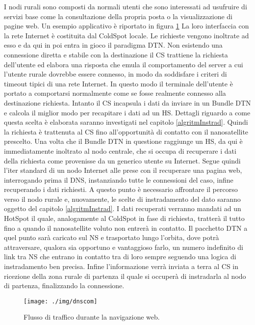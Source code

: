 \documentclass[12pt,a4paper,oneside]{book}
\begin{document}
		I nodi rurali sono composti da normali utenti che sono interessati ad usufruire di servizi base come la consultazione della propria posta o la visualizzazione di pagine web. Un esempio applicativo è riportato in figura \ref{fig:dnscom} La loro interfaccia con la rete Internet è costituita dal ColdSpot locale. Le richieste vengono inoltrate ad esso e da qui in poi entra in gioco il paradigma DTN. Non esistendo una connessione diretta e stabile con la destinazione il CS trattiene la richiesta dell'utente ed elabora una risposta che emula il comportamento del server a cui l'utente rurale dovrebbe essere connesso, in modo da soddisfare i criteri di timeout tipici di una rete Internet. In questo modo il terminale dell'utente è portato a comportarsi normalmente come se fosse realmente connesso alla destinazione richiesta. Intanto il CS incapsula i dati da inviare in un Bundle DTN e calcola il miglior modo per recapitare i dati ad un HS. Dettagli riguardo a come questa scelta è elaborata saranno investigati nel capitolo \ref{algritmInstrad}. Quindi la richiesta è trattenuta al CS fino all'opportunità di contatto con il nanosatellite prescelto. Una volta che il Bundle DTN in questione raggiunge un HS, da qui è immediatamente inoltrato al nodo centrale, che si occupa di recuperare i dati della richiesta come provenisse da un generico utente su Internet. Segue quindi l'iter standard di un nodo Internet alle prese con il recuperare una pagina web, interrogando prima il DNS, instanziando tutte le connessioni del caso, infine recuperando i dati richiesti. A questo punto è necessario affrontare il percorso verso il nodo rurale e, nuovamente, le scelte di instradamento del dato saranno oggetto del capitolo \ref{algritmInstrad}. I dati recuperati verranno mandati ad un HotSpot il quale, analogamente al ColdSpot in fase di richiesta, tratterà il tutto fino a quando il nanosatellite voluto non entrerà in contatto. Il pacchetto DTN a quel punto sarà caricato sul NS e trasportato lungo l'orbita, dove potrà attraversare, qualora sia opportuno e vantaggioso farlo, un numero indefinito di link tra NS che entrano in contatto tra di loro sempre seguendo una logica di instradamento ben precisa. Infine l'informazione verrà inviata a terra al CS in ricezione della zona rurale di partenza il quale si occuperà di instradarla al nodo di partenza, finalizzando la connessione.
		
		\begin{figure}[h]
			\centering
			\texttt{[image: ./img/dnscom]}
			\caption{Flusso di traffico durante la navigazione web.}
			\label{fig:dnscom}
		\end{figure}		
\end{document}
